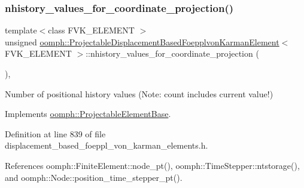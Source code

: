 \subsubsection{\texorpdfstring{nhistory\+\_\+values\+\_\+for\+\_\+coordinate\+\_\+projection()}{nhistory\_values\_for\_coordinate\_projection()}}
{\footnotesize\ttfamily template$<$class F\+V\+K\+\_\+\+E\+L\+E\+M\+E\+NT $>$ \\
unsigned \hyperlink{classoomph_1_1ProjectableDisplacementBasedFoepplvonKarmanElement}{oomph\+::\+Projectable\+Displacement\+Based\+Foepplvon\+Karman\+Element}$<$ F\+V\+K\+\_\+\+E\+L\+E\+M\+E\+NT $>$\+::nhistory\+\_\+values\+\_\+for\+\_\+coordinate\+\_\+projection (\begin{DoxyParamCaption}{ }\end{DoxyParamCaption})\hspace{0.3cm}{\ttfamily [inline]}, {\ttfamily [virtual]}}



Number of positional history values (Note\+: count includes current value!) 



Implements \hyperlink{classoomph_1_1ProjectableElementBase_ab4ecd0cd24000a3ed675dc7198203c1f}{oomph\+::\+Projectable\+Element\+Base}.



Definition at line 839 of file displacement\+\_\+based\+\_\+foeppl\+\_\+von\+\_\+karman\+\_\+elements.\+h.



References oomph\+::\+Finite\+Element\+::node\+\_\+pt(), oomph\+::\+Time\+Stepper\+::ntstorage(), and oomph\+::\+Node\+::position\+\_\+time\+\_\+stepper\+\_\+pt().

\mbox{\label{classoomph_1_1ProjectableDisplacementBasedFoepplvonKarmanElement_a860e5d23c30436549175b36b508e62a0}} 
